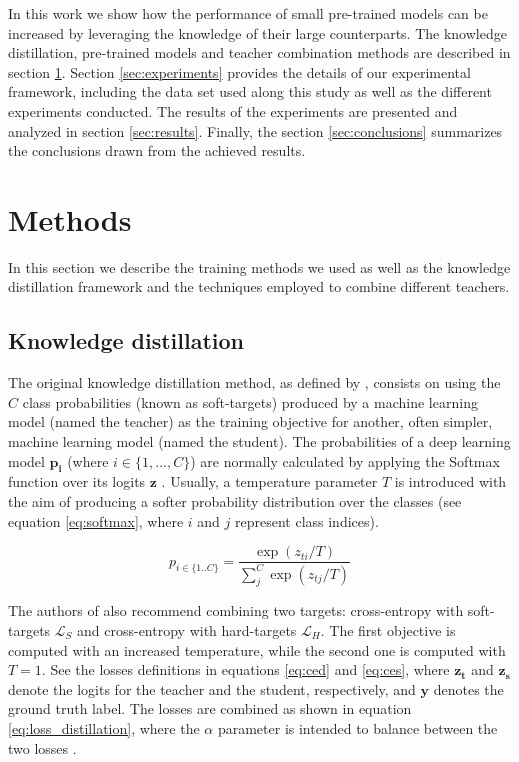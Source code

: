 \documentclass{elsarticle}
\begin{document}
	In this work we show how the performance of small pre-trained models can be increased by leveraging the knowledge of their large counterparts. The knowledge distillation, pre-trained models and teacher combination methods are described in section  \ref{sec:methods}. Section \ref{sec:experiments} provides the details of our experimental framework, including the data set used along this study as well as the different experiments conducted. The results of the experiments are presented and analyzed in section \ref{sec:results}. Finally, the section \ref{sec:conclusions} summarizes the conclusions drawn from the achieved results.
	
	\section{Methods} \label{sec:methods}
	In this section we describe the training methods we used as well as the knowledge distillation framework and the techniques employed to combine different teachers.
	
	\subsection{Knowledge distillation} \label{sec:kd}
	The original knowledge distillation method, as defined by \citep{hinton2015}, consists on using the $C$ class probabilities (known as soft-targets) produced by a machine learning model (named the teacher) as the training objective for another, often simpler, machine learning model (named the student). The probabilities of a deep learning model $\mathbf{p_i}$ (where $i \in \{1,...,C\}$) are normally calculated by applying the Softmax function over its logits $\mathbf{z}$ \citep{goodfellow2016}. Usually, a temperature parameter $T$ is introduced with the aim of producing a softer probability distribution over the classes (see equation \ref{eq:softmax}, where $i$ and $j$ represent class indices).
	
	\begin{equation}
	p_{i \in \{1 .. C\}} = \frac{\exp(z_{ti}/T)}{\sum_j^C \exp(z_{tj}/T)}
	\label{eq:softmax}
	\end{equation}
	
	The authors of \citep{hinton2015} also recommend combining two targets: cross-entropy with soft-targets $\mathcal{L}_S$ and cross-entropy with hard-targets  $\mathcal{L}_H$. The first objective is computed with an increased temperature, while the second one is computed with $T=1$. See the losses definitions in equations \ref{eq:ced} and \ref{eq:ces}, where $\mathbf{z_t}$ and $\mathbf{z_s}$ denote the logits for the teacher and the student, respectively, and $\mathbf{y}$ denotes the ground truth label. The losses are combined as shown in equation \ref{eq:loss_distillation}, where the $\alpha$ parameter is intended to balance between the two losses \citep{gou2020}.
	
\end{document}
